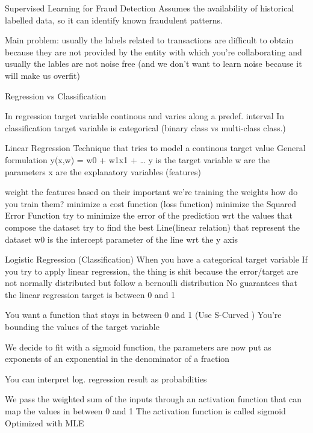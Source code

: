 Supervised Learning for Fraud Detection
    Assumes the availability of historical labelled data, so it can identify known fraudulent patterns.

    Main problem: usually the labels related to transactions are difficult to obtain
        because they are not provided by the entity with which you're collaborating
        and usually the lables are not noise free (and we don't want to learn noise because it will make us overfit)

    Regression vs Classification 
    
    In regression target variable continous and varies along a predef. interval
    In classification target variable is categorical (binary class vs multi-class class.)

    Linear Regression 
        Technique that tries to model a continous target value
        General formulation 
        y(x,w) = w0 + w1x1 + \dots
        y is the target variable 
        w are the parameters 
        x are the explanatory variables (features)

        weight the features based on their important
        we're training the weights 
        how do you train them?
            minimize a cost function (loss function)
            minimize the Squared Error Function 
            try to minimize the error of the prediction wrt the values that compose the dataset
            try to find the best Line(linear relation) that represent the dataset
            w0 is the intercept parameter of the line wrt the y axis 

    Logistic Regression (Classification)
        When you have a categorical target variable 
        If you try to apply linear regression, the thing is shit because
        the error/target are not normally distributed but follow a bernoulli distribution
        No guarantees that the linear regression target is between 0 and 1

        You want a function that stays in between 0 and 1 (Use S-Curved )
        You're bounding the values of the target variable 

        We decide to fit with a sigmoid function, the parameters are now put as 
        exponents of an exponential in the denominator of a fraction 

        You can interpret log. regression result as probabilities 

        We pass the weighted sum of the inputs through an activation function that 
        can map the values in between 0 and 1 
        The activation function is called sigmoid 
        Optimized with MLE 

